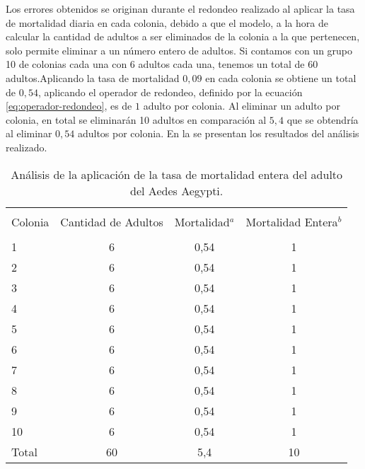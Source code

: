 Los errores obtenidos se originan durante el redondeo realizado al aplicar la tasa de
mortalidad diaria en cada colonia, debido a que el modelo, a la hora de calcular la cantidad de
adultos a ser eliminados de la colonia a la que pertenecen, solo permite eliminar a un número
entero de adultos. Si contamos con un grupo 10 de colonias cada una con 6 adultos cada una,
tenemos un total de 60 adultos.Aplicando la tasa de mortalidad $0,09$ en cada colonia se obtiene un
total de $0,54$, aplicando el operador de redondeo, definido por la ecuación
\eqref{eq:operador-redondeo}, es de $1$ adulto por colonia. Al eliminar un adulto por colonia, en
total se eliminarán 10 adultos en comparación al $5,4$ que se obtendría al eliminar $0,54$ adultos
por colonia. En la  se presentan los resultados del
análisis realizado.

\begin{table}[H]
    \begin{minipage}{\textwidth}
        \caption{ \label{tab:mortalidad-adulto-error} Análisis de la aplicación de la tasa de
        mortalidad entera del adulto del Aedes Aegypti.}
        \begin{tabular}{p{3cm} c c c }
                    \hline \\
                    Colonia & Cantidad de Adultos & Mortalidad$^{a}$ & Mortalidad Entera$^{b}$\\
                    \hline
                    \hline \\
                    1       & 6  & 0,54 & 1\\
                    2       & 6  & 0,54 & 1\\
                    3       & 6  & 0,54 & 1\\
                    4       & 6  & 0,54 & 1\\
                    5       & 6  & 0,54 & 1\\
                    6       & 6  & 0,54 & 1\\
                    7       & 6  & 0,54 & 1\\
                    8       & 6  & 0,54 & 1\\
                    9       & 6  & 0,54 & 1\\
                    10      & 6  & 0,54 & 1\\
                    Total   & 60 & 5,4  & 10\\
        \end{tabular}
    \end{minipage}
\end{table}
